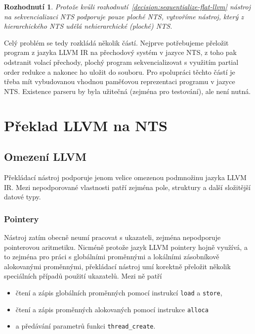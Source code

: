 \documentclass[12pt]{fithesis2}
\newtheorem{decision}  {Rozhodnutí}
\begin{document}
\begin{decision}\label{decision:do-nts-flattening}
Protože kvůli rozhodnutí~\ref{decision:sequentialize-flat-llvm} nástroj na sekvencializaci NTS podporuje pouze ploché NTS, vytvoříme nástroj, který z hierarchického NTS udělá nehierarchické (ploché) NTS.
\end{decision}

Celý problém se tedy rozkládá několik částí. Nejprve potřebujeme přeložit program z jazyka LLVM IR na přechodový systém v jazyce NTS, z toho pak odstranit volací přechody, plochý program sekvencializovat s využitím partial order redukce a nakonec ho uložit do souboru. Pro spolupráci těchto částí je třeba mít vybudovanou vhodnou paměťovou reprezentaci programu v jazyce NTS. Existence parseru by byla užitečná (zejména pro testování), ale není nutná.




\chapter{Překlad LLVM na NTS}
\label{sec:translation}
\section{Omezení LLVM}
Překládací nástroj podporuje jenom velice omezenou podmnožinu jazyka LLVM IR. Mezi nepodporované vlastnosti patří zejména pole, struktury a další složitější datové typy.

\subsection{Pointery}
Nástroj zatím obecně neumí pracovat s ukazateli, zejména nepodporuje pointerovou aritmetiku. Nicméně protože jazyk LLVM pointery hojně využívá, a to zejména pro práci s globálními proměnnými a lokálními zásobníkově alokovanými proměnnými, překládací nástroj umí korektně přeložit několik speciálních případů použití ukazatelů. Mezi ně patří
\begin{itemize}
\item čtení a zápis globálních proměnných pomocí instrukcí \texttt{load} a \texttt{store},
\item čtení a zápis proměnných alokovaných pomocí instrukce \texttt{alloca}
\item a předávání parametrů funkci \texttt{thread\_create}.
\end{itemize}
\end{document}
